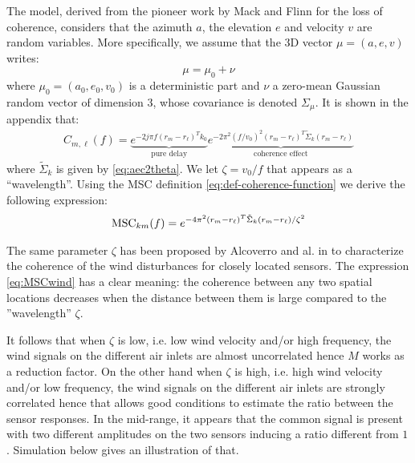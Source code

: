 The model, derived from the pioneer work by Mack and Flinn \cite{mack_flinn:1971} for the loss of coherence, considers that the azimuth $a$, the elevation $e$ and velocity $v$ are random variables. More specifically, we assume that the 3D vector $\mu=(a,e,v)$ writes:
\begin{equation}
 \label{eq:randomnesswn}
 \mu=\mu_{0}+\nu
\end{equation} 
where $\mu_{0}=(a_{0},e_{0},v_{0})$ is a deterministic part and $\nu$ a zero-mean Gaussian random vector of dimension 3, whose covariance is denoted $\Sigma_{\mu}$. It is shown in the appendix that:
\begin{eqnarray}
\label{eq:Cfr1r2Gaussian}
C_{m,\ell}(f)=
\underbrace{e^{-2j\pi f(r_{m}-r_{\ell})^{T}k_{0}}}_{\text{pure delay}}
 \underbrace{e^{-2\pi^{2}(f/v_0)^{2}(r_{m}-r_{\ell})^{T}
                 \tilde \Sigma_{k}(r_{m}-r_{\ell})}}_{\text{coherence effect}}
 \end{eqnarray}
where $\tilde \Sigma_{k}$ is given by \eqref{eq:aec2theta}. We let $\zeta=v_0/f$ that appears as a ``wavelength''. Using the MSC definition \eqref{eq:def-coherence-function}  we derive the following expression:
\begin{eqnarray}
\label{eq:MSCwind}
\mathrm{MSC}_{km}(f)=
e^{-4\pi^{2}(r_{m}-r_{\ell})^{T}
                 \tilde \Sigma_{k}(r_{m}-r_{\ell})/\zeta^{2}}
 \end{eqnarray}

The same parameter $\zeta$ has been proposed by Alcoverro and al. in \cite{alcoverro:2005} to characterize the coherence of the wind disturbances for closely located sensors. The expression \eqref{eq:MSCwind} has a clear meaning: the coherence  between any two spatial locations decreases when the distance between them is large compared to the ''wavelength'' $\zeta$. 

It follows that when $\zeta$ is low, i.e. low wind velocity and/or high frequency, the wind signals on the different air inlets are almost uncorrelated hence $M$ works as a reduction factor. On the other hand when $\zeta$ is high, i.e. high wind velocity and/or low frequency, the wind signals on the different air inlets are strongly correlated hence that allows good conditions to estimate the ratio between the sensor responses. In the mid-range, it appears that the common signal is present with two different amplitudes on the two sensors inducing a ratio different from $1$. Simulation below gives an illustration of that.




